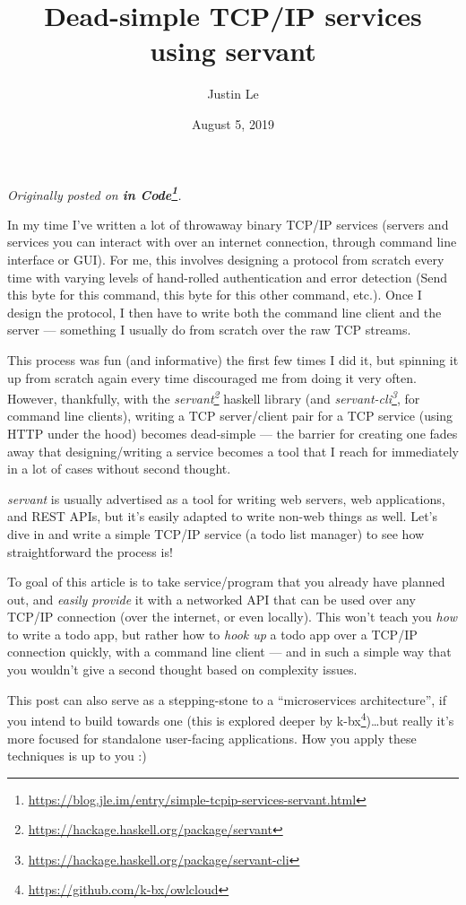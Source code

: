 \documentclass[]{article}
\title{Dead-simple TCP/IP services using servant}
\author{Justin Le}
\date{August 5, 2019}
\renewcommand{\href}[2]{#2\footnote{\url{#1}}}
\begin{document}
\maketitle

\emph{Originally posted on
\textbf{\href{https://blog.jle.im/entry/simple-tcpip-services-servant.html}{in
Code}}.}

In my time I've written a lot of throwaway binary TCP/IP services (servers and
services you can interact with over an internet connection, through command line
interface or GUI). For me, this involves designing a protocol from scratch every
time with varying levels of hand-rolled authentication and error detection (Send
this byte for this command, this byte for this other command, etc.). Once I
design the protocol, I then have to write both the command line client and the
server --- something I usually do from scratch over the raw TCP streams.

This process was fun (and informative) the first few times I did it, but
spinning it up from scratch again every time discouraged me from doing it very
often. However, thankfully, with the
\emph{\href{https://hackage.haskell.org/package/servant}{servant}} haskell
library (and
\emph{\href{https://hackage.haskell.org/package/servant-cli}{servant-cli}}, for
command line clients), writing a TCP server/client pair for a TCP service (using
HTTP under the hood) becomes dead-simple --- the barrier for creating one fades
away that designing/writing a service becomes a tool that I reach for
immediately in a lot of cases without second thought.

\emph{servant} is usually advertised as a tool for writing web servers, web
applications, and REST APIs, but it's easily adapted to write non-web things as
well. Let's dive in and write a simple TCP/IP service (a todo list manager) to
see how straightforward the process is!

To goal of this article is to take service/program that you already have planned
out, and \emph{easily provide} it with a networked API that can be used over any
TCP/IP connection (over the internet, or even locally). This won't teach you
\emph{how} to write a todo app, but rather how to \emph{hook up} a todo app over
a TCP/IP connection quickly, with a command line client --- and in such a simple
way that you wouldn't give a second thought based on complexity issues.

This post can also serve as a stepping-stone to a ``microservices
architecture'', if you intend to build towards one (this is explored deeper by
\href{https://github.com/k-bx/owlcloud}{k-bx})\ldots but really it's more
focused for standalone user-facing applications. How you apply these techniques
is up to you :)
\end{document}
